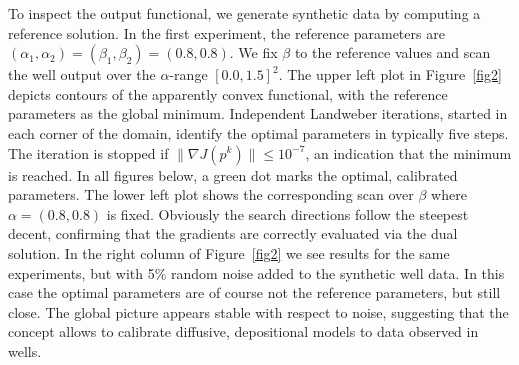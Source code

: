 To inspect the output functional, we generate synthetic data by
computing a reference solution.  In the first experiment, the
reference parameters are
$(\alpha_1, \alpha_2)=(\beta_1, \beta_2)=(0.8,0.8)$.  We fix $\beta$
to the reference values and scan the well output over the
$\alpha$-range $[0.0, 1.5]^2$. The upper left plot in
Figure~\ref{fig2} depicts contours of the apparently convex
functional, with the reference parameters as the global minimum.
Independent Landweber iterations, started in each corner of the domain,
identify the optimal parameters in typically five steps.  The
iteration is stopped if $\| \nabla J(p^k) \| \le 10^{-7}$, an
indication that the minimum is reached.  In all figures below, a green
dot marks the optimal, calibrated parameters.  The lower left plot
shows the corresponding scan over $\beta$ where $\alpha=(0.8,0.8)$ is
fixed.  Obviously the search directions follow the steepest decent,
confirming that the gradients are correctly evaluated via the dual
solution.  In the right column of Figure~\ref{fig2} we see results for
the same experiments, but with 5\% random noise added to the synthetic
well data.  In this case the optimal parameters are of course not the
reference parameters, but still close.  The global picture appears
stable with respect to noise, suggesting that the concept allows to
calibrate diffusive, depositional models to data observed in wells.

